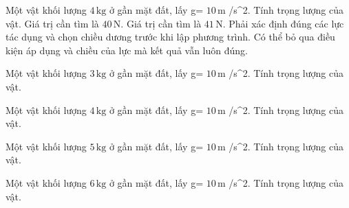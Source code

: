 \begin{ex}
Một vật khối lượng $4\,\text{kg}$ ở gần mặt đất, lấy g= $10\,\text{m}$ /s^2. Tính trọng lượng của vật.
\choiceTF
{\True Giá trị cần tìm là $40\,\text{N}$.}
{Giá trị cần tìm là $41\,\text{N}$.}
{\True Phải xác định đúng các lực tác dụng và chọn chiều dương trước khi lập phương trình.}
{Có thể bỏ qua điều kiện áp dụng và chiều của lực mà kết quả vẫn luôn đúng.}
\end{ex}

\begin{ex}
Một vật khối lượng $3\,\text{kg}$ ở gần mặt đất, lấy g= $10\,\text{m}$ /s^2. Tính trọng lượng của vật.
\end{ex}

\begin{ex}
Một vật khối lượng $4\,\text{kg}$ ở gần mặt đất, lấy g= $10\,\text{m}$ /s^2. Tính trọng lượng của vật.
\end{ex}

\begin{ex}
Một vật khối lượng $5\,\text{kg}$ ở gần mặt đất, lấy g= $10\,\text{m}$ /s^2. Tính trọng lượng của vật.
\end{ex}

\begin{ex}
Một vật khối lượng $6\,\text{kg}$ ở gần mặt đất, lấy g= $10\,\text{m}$ /s^2. Tính trọng lượng của vật.
\end{ex}

